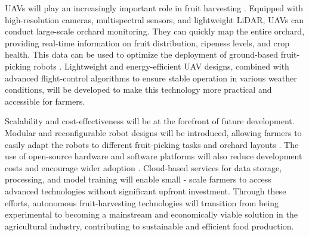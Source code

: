 \documentclass[a4paper,fleqn]{cas-dc}
\begin{document}
UAVs will play an increasingly important role in fruit harvesting \cite{mohamed2021smart, martos2021ensuring}. Equipped with high-resolution cameras, multispectral sensors, and lightweight LiDAR, UAVs can conduct large-scale orchard monitoring. They can quickly map the entire orchard, providing real-time information on fruit distribution, ripeness levels, and crop health. This data can be used to optimize the deployment of ground-based fruit-picking robots \cite{martos2021ensuring}. Lightweight and energy-efficient UAV designs, combined with advanced flight-control algorithms to ensure stable operation in various weather conditions, will be developed to make this technology more practical and accessible for farmers.

Scalability and cost-effectiveness will be at the forefront of future development. Modular and reconfigurable robot designs will be introduced, allowing farmers to easily adapt the robots to different fruit-picking tasks and orchard layouts \cite{lytridis2021overview, li2023multi}. The use of open-source hardware and software platforms will also reduce development costs and encourage wider adoption \cite{zhang2024automatic}. Cloud-based services for data storage, processing, and model training will enable small - scale farmers to access advanced technologies without significant upfront investment. Through these efforts, autonomous fruit-harvesting technologies will transition from being experimental to becoming a mainstream and economically viable solution in the agricultural industry, contributing to sustainable and efficient food production.
\end{document}
